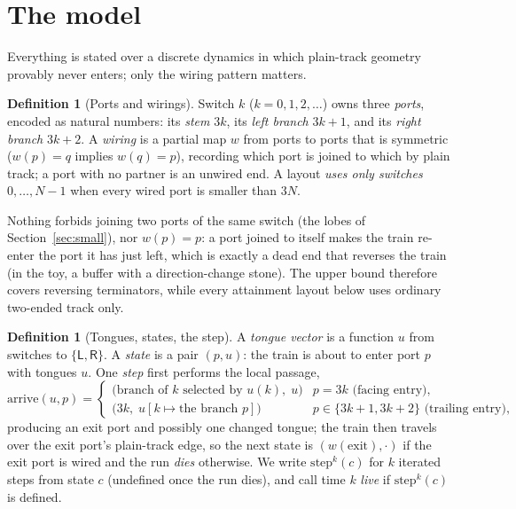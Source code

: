 \documentclass[11pt]{article}
\theoremstyle{definition}
\newtheorem{definition}[theorem]{Definition}
\newcommand{\stepN}{\mathrm{step}}
\newcommand{\Left}{\mathsf{L}}
\newcommand{\Right}{\mathsf{R}}
\begin{document}
\section{The model}\label{sec:model}

Everything is stated over a discrete dynamics in which plain-track
geometry provably never enters; only the wiring pattern matters.

\begin{definition}[Ports and wirings]\label{def:wiring}
  Switch $k$ ($k = 0, 1, 2, \dots$) owns three \emph{ports}, encoded as
  natural numbers: its \emph{stem} $3k$, its \emph{left branch} $3k+1$,
  and its \emph{right branch} $3k+2$.  A \emph{wiring} is a partial map
  $w$ from ports to ports that is symmetric ($w(p) = q$ implies
  $w(q) = p$), recording which port is joined to which by plain track; a
  port with no partner is an unwired end.  A layout \emph{uses only
  switches $0,\dots,N-1$} when every wired port is smaller than $3N$.
\end{definition}

Nothing forbids joining two ports of the same switch (the lobes of
Section~\ref{sec:small}), nor $w(p) = p$: a port joined to itself makes
the train re-enter the port it has just left, which is exactly a dead end
that reverses the train (in the toy, a buffer with a direction-change
stone).  The upper bound therefore covers reversing terminators, while
every attainment layout below uses ordinary two-ended track only.

\begin{definition}[Tongues, states, the step]\label{def:step}
  A \emph{tongue vector} is a function $u$ from switches to
  $\{\Left,\Right\}$.  A \emph{state} is a pair $(p, u)$: the train is
  about to enter port $p$ with tongues $u$.  One \emph{step} first
  performs the local passage,
  \[
    \mathrm{arrive}(u, p) =
    \begin{cases}
      \bigl(\text{branch of }k\text{ selected by }u(k),\; u\bigr)
        & p = 3k \text{ (facing entry)},\\[2pt]
      \bigl(3k,\; u[k \mapsto \text{the branch }p]\bigr)
        & p \in \{3k{+}1, 3k{+}2\} \text{ (trailing entry)},
    \end{cases}
  \]
  producing an exit port and possibly one changed tongue; the train then
  travels over the exit port's plain-track edge, so the next state is
  $(w(\text{exit}), \cdot)$ if the exit port is wired and the run
  \emph{dies} otherwise.  We write $\stepN^k(c)$ for $k$ iterated steps
  from state $c$ (undefined once the run dies), and call time $k$
  \emph{live} if $\stepN^k(c)$ is defined.
\end{definition}
\end{document}
